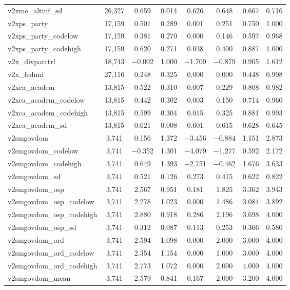 \begin{table}[!htbp]
\begin{tabular}{@{\extracolsep{5pt}}lccccccc}
v2xme\_altinf\_sd & 26,327 & 0.659 & 0.014 & 0.626 & 0.648 & 0.667 & 0.716 \\ 
v2xps\_party & 17,159 & 0.501 & 0.289 & 0.001 & 0.251 & 0.750 & 1.000 \\ 
v2xps\_party\_codelow & 17,159 & 0.381 & 0.270 & 0.000 & 0.146 & 0.597 & 0.968 \\ 
v2xps\_party\_codehigh & 17,159 & 0.620 & 0.271 & 0.038 & 0.400 & 0.887 & 1.000 \\ 
v2x\_divparctrl & 18,743 & $-$0.002 & 1.000 & $-$1.709 & $-$0.879 & 0.905 & 1.612 \\ 
v2x\_feduni & 27,116 & 0.248 & 0.325 & 0.000 & 0.000 & 0.448 & 0.998 \\ 
v2xca\_academ & 13,815 & 0.522 & 0.310 & 0.007 & 0.229 & 0.808 & 0.982 \\ 
v2xca\_academ\_codelow & 13,815 & 0.442 & 0.302 & 0.003 & 0.150 & 0.714 & 0.960 \\ 
v2xca\_academ\_codehigh & 13,815 & 0.599 & 0.304 & 0.015 & 0.325 & 0.881 & 0.993 \\ 
v2xca\_academ\_sd & 13,815 & 0.621 & 0.008 & 0.601 & 0.615 & 0.628 & 0.645 \\ 
v2smgovdom & 3,741 & 0.156 & 1.372 & $-$3.456 & $-$0.884 & 1.151 & 2.873 \\ 
v2smgovdom\_codelow & 3,741 & $-$0.352 & 1.301 & $-$4.079 & $-$1.277 & 0.592 & 2.172 \\ 
v2smgovdom\_codehigh & 3,741 & 0.649 & 1.393 & $-$2.751 & $-$0.462 & 1.676 & 3.633 \\ 
v2smgovdom\_sd & 3,741 & 0.521 & 0.126 & 0.273 & 0.415 & 0.622 & 0.822 \\ 
v2smgovdom\_osp & 3,741 & 2.567 & 0.951 & 0.181 & 1.825 & 3.362 & 3.943 \\ 
v2smgovdom\_osp\_codelow & 3,741 & 2.278 & 1.023 & 0.000 & 1.486 & 3.084 & 3.892 \\ 
v2smgovdom\_osp\_codehigh & 3,741 & 2.880 & 0.918 & 0.286 & 2.196 & 3.698 & 4.000 \\ 
v2smgovdom\_osp\_sd & 3,741 & 0.312 & 0.087 & 0.113 & 0.253 & 0.366 & 0.580 \\ 
v2smgovdom\_ord & 3,741 & 2.594 & 1.098 & 0.000 & 2.000 & 3.000 & 4.000 \\ 
v2smgovdom\_ord\_codelow & 3,741 & 2.354 & 1.154 & 0.000 & 1.000 & 3.000 & 4.000 \\ 
v2smgovdom\_ord\_codehigh & 3,741 & 2.773 & 1.072 & 0.000 & 2.000 & 4.000 & 4.000 \\ 
v2smgovdom\_mean & 3,741 & 2.579 & 0.841 & 0.167 & 2.000 & 3.200 & 4.000 \\ 

\end{tabular}
\end{table}
